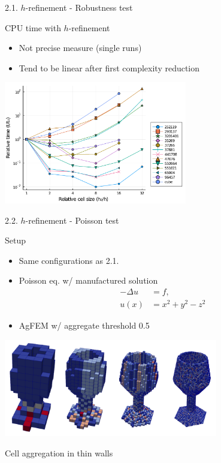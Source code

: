\documentclass{beamer}
\begin{document}
\begin{frame}{2.1. $h$-refinement - Robustness test}

  \begin{block}{CPU time with $h$-refinement}
  \begin{itemize}
    \item
      Not precise measure (single runs)
    \item
      Tend to be linear after first complexity reduction
  \end{itemize}
  \end{block}

  \centering
  \includegraphics[width=0.60\textwidth]{../analysis/plots/x_nmax_y_time}

\end{frame}

\begin{frame}{2.2. $h$-refinement - Poisson test}
  \begin{block}{Setup}
    \begin{itemize}
      \item
        Same configurations as 2.1.
      \item
        Poisson eq. w/ manufactured solution
        \begin{align*}
          -\Delta u &= f,\\
          u(x) &= x^2+y^2-z^2
        \end{align*}
      \item
        AgFEM w/ aggregate threshold 0.5
    \end{itemize}
  \end{block}
  \centering
  \includegraphics[width=0.7\textwidth]{aggregates}

  {\tiny Cell aggregation in thin walls}

\end{frame}
\end{document}
